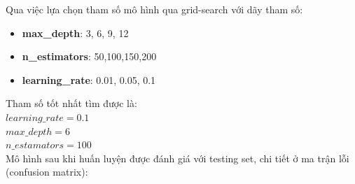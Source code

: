 Qua việc lựa chọn tham số mô hình qua grid-search với dãy tham số:
\begin{itemize}
    \item \textbf{max\_depth}: 3, 6, 9, 12
    \item \textbf{n\_estimators}: 50,100,150,200
    \item \textbf{learning\_rate}: 0.01, 0.05, 0.1
\end{itemize}
Tham số tốt nhất tìm được là: \\
$learning\_rate = 0.1$\\
$max\_depth = 6$\\
$n\_estamators = 100$\\
Mô hình sau khi huấn luyện được đánh giá với testing set, chi tiết ở ma trận lỗi (confusion matrix):

